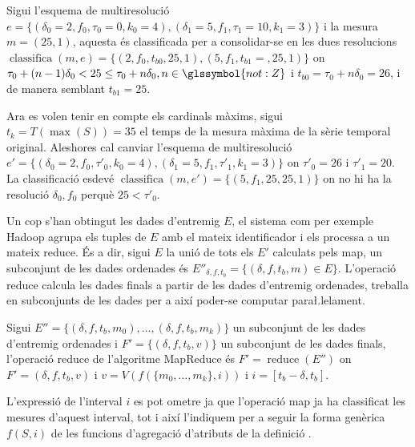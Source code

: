 \begin{example}
  Sigui l'esquema de multiresolució
  $e=\{(\delta_0=2,f_0,\tau_0=0,k_0=4),(\delta_1=5,f_1,\tau_1=10,k_1=3)\}$
  i la mesura $m=(25,1)$, aquesta és classificada per a consolidar-se
  en les dues resolucions $\operatorname{classifica}(m,e)=\{
  (2,f_0,t_{b0},25,1), (5,f_1,t_{b1}=,25,1) \}$ on
  $\tau_0+(n-1)\delta_0 < 25 \leq \tau_0+n\delta_0,
  n\in\glssymbol{not:Z}$ i $t_{b0}=\tau_0+n\delta_0 = 26$, i de manera
  semblant $t_{b1}= 25$.

  Ara es volen tenir en compte els cardinals màxims, sigui
  $t_k=T(\max(S))=35$ el temps de la mesura màxima de la sèrie
  temporal original. Aleshores cal canviar l'esquema de multiresolució
  $e'=\{(\delta_0=2,f_0,\tau'_0,k_0=4),(\delta_1=5,f_1,\tau'_1,k_1=3)\}$
  on $\tau'_0=26$ i $\tau'_1=20$. La classificació esdevé
  $\operatorname{classifica}(m,e')=\{ (5,f_1,25,25,1) \}$ on no hi ha
  la resolució $\delta_0,f_0$ perquè $25< \tau'_0$.
\end{example}





Un cop s'han obtingut les dades d'entremig $E$, el sistema com per
exemple Hadoop agrupa els tuples de $E$ amb el mateix identificador i
els processa a un mateix reduce. És a dir, sigui $E$ la unió de tots
els $E'$ calculats pels map, un subconjunt de les dades ordenades és
$E''_{\delta,f,t_b} = \{ (\delta,f,t_b,m) \in E \}$.  L'operació
reduce calcula les dades finals a partir de les dades d'entremig
ordenades, treballa en subconjunts de les dades per a així poder-se
computar para\l.lelament.
\begin{definition}
  Sigui $E''= \{ (\delta,f,t_b,m_0) ,\dotsc, (\delta,f,t_b,m_k) \}$ un
  subconjunt de les dades d'entremig ordenades i $F'=\{
  (\delta,f,t_b,v) \}$ un subconjunt de les dades finals, l'operació
  reduce de l'algoritme MapReduce és $F'=\operatorname{reduce}(E'')$
  on $F'= (\delta,f,t_b,v)$ i $v= V( f(\{m_0,\dotsc,m_k\},i))$ i
  $i=[t_b-\delta,t_b]$.

  L'expressió de l'interval $i$ es pot ometre ja que l'operació map ja
  ha classificat les mesures d'aquest interval, tot i així l'indiquem
  per a seguir la forma genèrica $f(S,i)$ de les funcions d'agregació
  d'atributs de la definició .
\end{definition}





